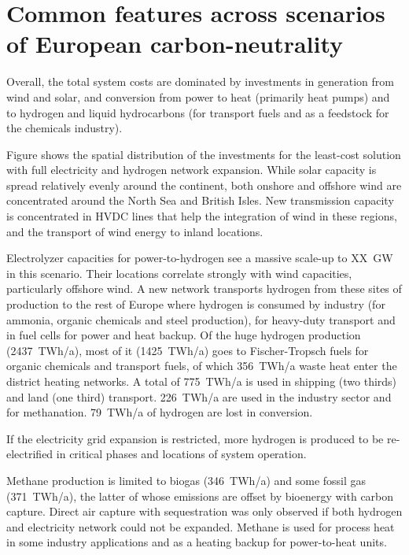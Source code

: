 \section*{Common features across scenarios of European carbon-neutrality}
\label{sec:es}

Overall, the total system costs are dominated by investments in generation from wind
and solar, and conversion from power to heat (primarily heat pumps)
and to hydrogen and liquid hydrocarbons (for transport fuels and as a
feedstock for the chemicals industry).

Figure shows the spatial distribution of the investments
for the least-cost solution with full electricity and hydrogen network expansion. While solar capacity is spread
relatively evenly around the continent, both onshore and offshore wind
are concentrated around the North Sea and British Isles. New
transmission capacity is concentrated in HVDC lines that help the
integration of wind in these regions, and the transport of wind energy
to inland locations.

Electrolyzer capacities for power-to-hydrogen see a massive scale-up to XX~GW in
this scenario. Their locations correlate strongly with wind capacities,
particularly offshore wind. A new network transports hydrogen from these sites
of production to the rest of Europe where hydrogen is consumed by industry (for
ammonia, organic chemicals and steel production), for heavy-duty transport and
in fuel cells for power and heat backup. Of the huge hydrogen production
(2437~TWh/a), most of it (1425~TWh/a) goes to Fischer-Tropsch fuels for organic
chemicals and transport fuels, of which 356~TWh/a waste heat enter the district
heating networks. A total of 775~TWh/a is used in shipping (two thirds) and land
(one third) transport. 226~TWh/a are used in the industry sector and for
methanation. 79~TWh/a of hydrogen are lost in conversion.

If the electricity grid expansion is restricted, more hydrogen is produced to be
re-electrified in critical phases and locations of system operation.

Methane production is limited to biogas (346~TWh/a) and some fossil gas
(371~TWh/a), the latter of whose emissions are offset by bioenergy with carbon
capture. Direct air capture with sequestration was only observed if both
hydrogen and electricity network could not be expanded. Methane is used for
process heat in some industry applications and as a heating backup for
power-to-heat units.

